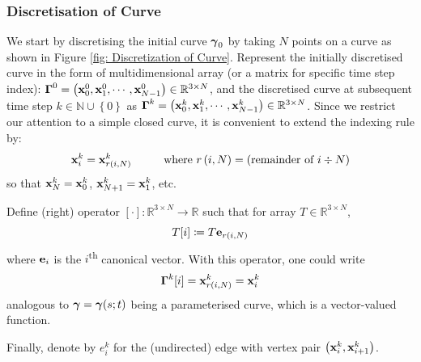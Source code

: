 \documentclass[../dissertation.tex]{subfiles}
\begin{document}
\subsubsection{Discretisation of Curve}
We start by discretising the initial curve $\boldsymbol{\gamma}_0$ by taking $N$ points on a curve as shown in Figure \ref{fig: Discretization of Curve}.
Represent the initially discretised curve in the form of multidimensional array (or a matrix for specific time step index):
$\boldsymbol{\Gamma}^0 = \left( \mathbf{x}_0^0, \mathbf{x}_1^0, \cdots, \mathbf{x}_{N-1}^0 \right) \in \mathbb{R}^{3 \times N}$,
and the discretised curve at subsequent time step $k \in \mathbb{N} \cup \left\{ 0 \right\}$ as $\boldsymbol{\Gamma}^k = \left( \mathbf{x}_0^k, \mathbf{x}_1^k, \cdots, \mathbf{x}_{N-1}^k \right) \in \mathbb{R}^{3 \times N}$.
Since we restrict our attention to a simple closed curve, it is convenient to extend the indexing rule by:
\begin{equation}
    \mathbf{x}_{i}^k = \mathbf{x}_{r\left( i,N \right)}^k \hspace{1cm} \text{where } r\left( i,N \right) = \text{(remainder of } i \div N \text{)}
\end{equation}
so that $\mathbf{x}_N^k = \mathbf{x}_{0}^k$, $\mathbf{x}_{N+1}^k = \mathbf{x}_{1}^k$, etc.

Define (right) operator $[\cdot]:\mathbb{R}^{3 \times N} \rightarrow \mathbb{R}$ such that for array $T \in \mathbb{R}^{3 \times N}$,
\begin{equation*}
    T[i] \coloneqq T \mathbf{e}_{r\left( i,N \right)}
\end{equation*}
where $\mathbf{e}_i$ is the $i$\textsuperscript{th} canonical vector.
With this operator, one could write
\begin{equation}
    \boldsymbol{\Gamma}^k [i] = \mathbf{x}_{r\left( i, N \right)}^k = \mathbf{x}_i^k
\end{equation}
analogous to $\boldsymbol{\gamma} = \boldsymbol{\gamma}(s;t)$ being a parameterised curve, which is a vector-valued function.

Finally, denote by $e_{i}^k$ for the (undirected) edge with vertex pair $\left( \mathbf{x}_i^k, \mathbf{x}_{i+1}^k \right)$.
\end{document}
